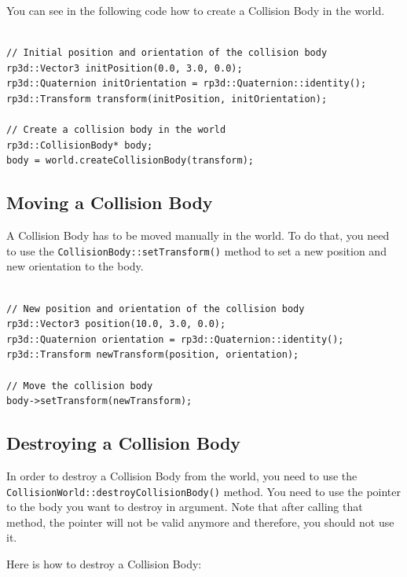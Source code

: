 \documentclass[a4paper,12pt]{article}
\begin{document}
    You can see in the following code how to create a Collision Body in the world. \\

    \begin{lstlisting}

// Initial position and orientation of the collision body
rp3d::Vector3 initPosition(0.0, 3.0, 0.0);
rp3d::Quaternion initOrientation = rp3d::Quaternion::identity();
rp3d::Transform transform(initPosition, initOrientation);

// Create a collision body in the world
rp3d::CollisionBody* body;
body = world.createCollisionBody(transform);
  \end{lstlisting}

    \subsection{Moving a Collision Body}

    A Collision Body has to be moved manually in the world. To do that, you need to use the \texttt{CollisionBody::setTransform()} method to set a new position and new
   orientation to the body.

     \begin{lstlisting}

// New position and orientation of the collision body
rp3d::Vector3 position(10.0, 3.0, 0.0);
rp3d::Quaternion orientation = rp3d::Quaternion::identity();
rp3d::Transform newTransform(position, orientation);

// Move the collision body
body->setTransform(newTransform);
  \end{lstlisting}

    \subsection{Destroying a Collision Body}

    \begin{sloppypar}
    In order to destroy a Collision Body from the world, you need to use the \texttt{CollisionWorld::destroyCollisionBody()} method. You need to use the pointer to the body you
    want to destroy in argument. Note that after calling that method, the pointer will not be valid anymore and therefore, you should not use it. \\
    \end{sloppypar}

    Here is how to destroy a Collision Body: \\
\end{document}
